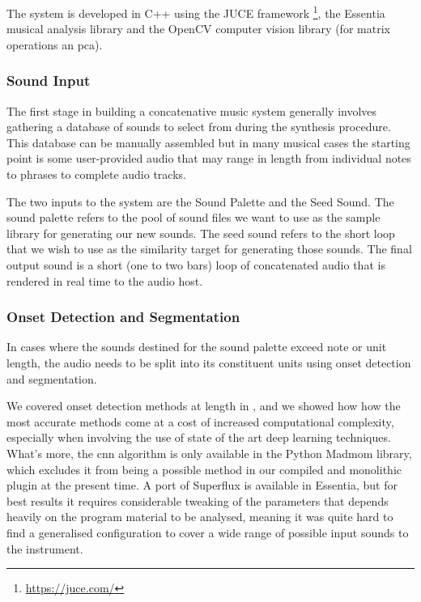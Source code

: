 The system is developed in C++ using the JUCE framework \footnote{\url{https://juce.com/}}, the Essentia musical analysis library \citep{Bogdanov2013} and the OpenCV computer vision library \citep{Bradski2000} (for matrix operations an \acrshort{pca}).
 
\subsubsection{Sound Input}

The first stage in building a concatenative music system generally involves gathering a database of sounds to select from during the synthesis procedure. This database can be manually assembled but in many musical cases the starting point is some user-provided audio that may range in length from individual notes to phrases to complete audio tracks.
 
The two inputs to the system are the Sound Palette and the Seed Sound. The sound palette refers to the pool of sound files we want to use as the sample library for generating our new sounds. The seed sound refers to the short loop that we wish to use as the similarity target for generating those sounds. The final output sound is a short (one to two bars) loop of concatenated audio that is rendered in real time to the audio host.

\subsubsection{Onset Detection and Segmentation}

In cases where the sounds destined for the sound palette exceed note or unit length, the audio needs to be split into its constituent units using onset detection and segmentation.

We covered onset detection methods at length in , and we showed how how the most accurate methods come at a cost of increased computational complexity, especially when involving the use of state of the art deep learning techniques. What's more, the \acrshort{cnn} algorithm is only available in the Python Madmom library, which excludes it from being a possible method in our compiled and monolithic plugin at the present time. A port of Superflux is available in Essentia, but for best results it requires considerable tweaking of the parameters that depends heavily on the program material to be analysed, meaning it was quite hard to find a generalised configuration to cover a wide range of possible input sounds to the instrument. 

